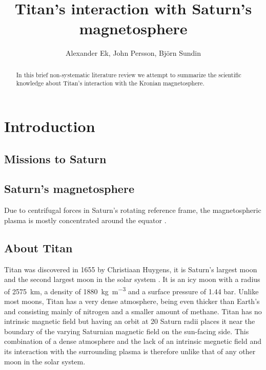 \documentclass[12pt, parskip=full*, abstract]{scrartcl}
\title{Titan's interaction with Saturn's magnetosphere}
\author{Alexander Ek, John Persson, Björn Sundin}
\begin{document}
\maketitle
\vspace{5mm}
\begin{abstract}
	In this brief non-systematic literature review we attempt to summarize the scientific knowledge about Titan's interaction with the Kronian magnetosphere.
\end{abstract}

\tableofcontents
\newpage

\section{Introduction}
\subsection{Missions to Saturn}


\subsection{Saturn's magnetosphere}

Due to centrifugal forces in Saturn's rotating reference frame, the magnetospheric plasma is mostly concentrated around the equator \parencite{solar-system-magnetospheres}.



\subsection{About Titan}
Titan was discovered in 1655 by Christiaan Huygens, it is Saturn's largest moon and the second largest moon in the solar system \parencite{fundamental-planetary-science}. It is an icy moon with a radius of \SI{2575}{\kilo\metre}, a density of \SI{1880}{\kilogram\per\metre^3} and a surface pressure of 1.44 bar. Unlike most moons, Titan has a very dense atmosphere, being even thicker than Earth's and consisting mainly of nitrogen and a smaller amount of methane. Titan has no intrinsic magnetic field but having an orbit at 20 Saturn radii places it near the boundary of the varying Saturnian magnetic field on the sun-facing side. This combination of a dense atmosphere and the lack of an intrinsic megnetic field and its interaction with the surrounding plasma is therefore unlike that of any other moon in the solar system. 
\end{document}
